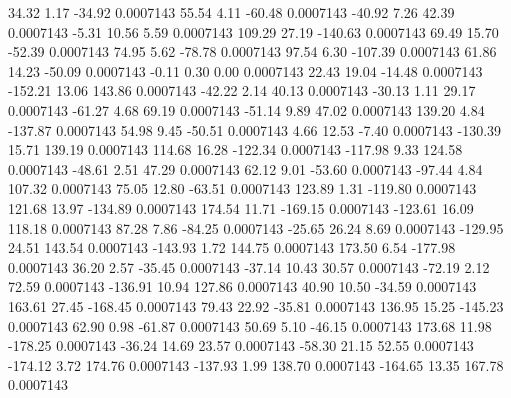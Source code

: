        34.32        1.17      -34.92     0.0007143
       55.54        4.11      -60.48     0.0007143
      -40.92        7.26       42.39     0.0007143
       -5.31       10.56        5.59     0.0007143
      109.29       27.19     -140.63     0.0007143
       69.49       15.70      -52.39     0.0007143
       74.95        5.62      -78.78     0.0007143
       97.54        6.30     -107.39     0.0007143
       61.86       14.23      -50.09     0.0007143
       -0.11        0.30        0.00     0.0007143
       22.43       19.04      -14.48     0.0007143
     -152.21       13.06      143.86     0.0007143
      -42.22        2.14       40.13     0.0007143
      -30.13        1.11       29.17     0.0007143
      -61.27        4.68       69.19     0.0007143
      -51.14        9.89       47.02     0.0007143
      139.20        4.84     -137.87     0.0007143
       54.98        9.45      -50.51     0.0007143
        4.66       12.53       -7.40     0.0007143
     -130.39       15.71      139.19     0.0007143
      114.68       16.28     -122.34     0.0007143
     -117.98        9.33      124.58     0.0007143
      -48.61        2.51       47.29     0.0007143
       62.12        9.01      -53.60     0.0007143
      -97.44        4.84      107.32     0.0007143
       75.05       12.80      -63.51     0.0007143
      123.89        1.31     -119.80     0.0007143
      121.68       13.97     -134.89     0.0007143
      174.54       11.71     -169.15     0.0007143
     -123.61       16.09      118.18     0.0007143
       87.28        7.86      -84.25     0.0007143
      -25.65       26.24        8.69     0.0007143
     -129.95       24.51      143.54     0.0007143
     -143.93        1.72      144.75     0.0007143
      173.50        6.54     -177.98     0.0007143
       36.20        2.57      -35.45     0.0007143
      -37.14       10.43       30.57     0.0007143
      -72.19        2.12       72.59     0.0007143
     -136.91       10.94      127.86     0.0007143
       40.90       10.50      -34.59     0.0007143
      163.61       27.45     -168.45     0.0007143
       79.43       22.92      -35.81     0.0007143
      136.95       15.25     -145.23     0.0007143
       62.90        0.98      -61.87     0.0007143
       50.69        5.10      -46.15     0.0007143
      173.68       11.98     -178.25     0.0007143
      -36.24       14.69       23.57     0.0007143
      -58.30       21.15       52.55     0.0007143
     -174.12        3.72      174.76     0.0007143
     -137.93        1.99      138.70     0.0007143
     -164.65       13.35      167.78     0.0007143
